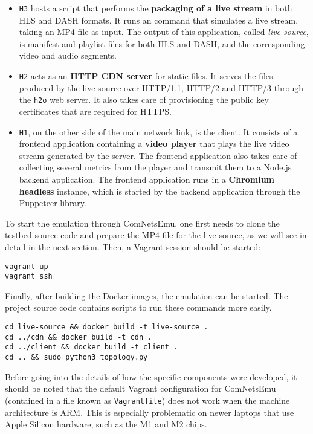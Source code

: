 \begin{itemize}
    \item \texttt{H3} hosts a script that performs the \textbf{packaging of a live stream} in both HLS and DASH formats. It runs an \ffmpeg{} command that simulates a live stream, taking an MP4 file as input. The output of this application, called \textit{live source}, is manifest and playlist files for both HLS and DASH, and the corresponding video and audio segments.
    \item \texttt{H2} acts as an \textbf{HTTP CDN server} for static files. It serves the files produced by the live source over HTTP/1.1, HTTP/2 and HTTP/3 through the \texttt{h2o} web server. It also takes care of provisioning the public key certificates that are required for HTTPS.
    \item \texttt{H1}, on the other side of the main network link, is the client. It consists of a frontend application containing a \textbf{video player} that plays the live video stream generated by the server. The frontend application also takes care of collecting several metrics from the player and transmit them to a Node.js backend application. The frontend application runs in a \textbf{Chromium headless} instance, which is started by the backend application through the Puppeteer library.
\end{itemize}


To start the emulation through ComNetsEmu, one first needs to clone the testbed source code and prepare the MP4 file for the live source, as we will see in detail in the next section. Then, a Vagrant session should be started:

\begin{verbatim}
vagrant up
vagrant ssh
\end{verbatim}

Finally, after building the Docker images, the emulation can be started. The project source code contains scripts to run these commands more easily.

\begin{verbatim}
cd live-source && docker build -t live-source .
cd ../cdn && docker build -t cdn .
cd ../client && docker build -t client .
cd .. && sudo python3 topology.py
\end{verbatim}

Before going into the details of how the specific components were developed, it should be noted that the default Vagrant configuration for ComNetsEmu (contained in a file known as \texttt{Vagrantfile}) does not work when the machine architecture is ARM. This is especially problematic on newer laptops that use Apple Silicon hardware, such as the M1 and M2 chips.

